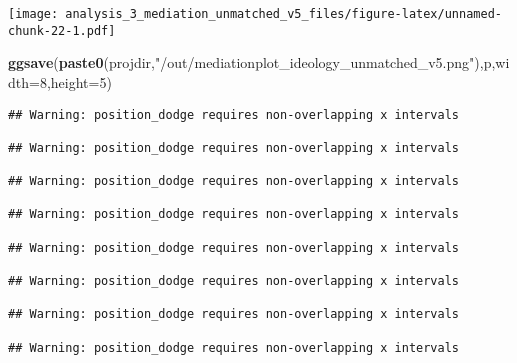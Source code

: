 \documentclass[
]{article}
\newenvironment{Shaded}{\begin{snugshade}}{\end{snugshade}}
\newcommand{\DataTypeTok}[1]{\textcolor[rgb]{0.13,0.29,0.53}{#1}}
\newcommand{\DecValTok}[1]{\textcolor[rgb]{0.00,0.00,0.81}{#1}}
\newcommand{\KeywordTok}[1]{\textcolor[rgb]{0.13,0.29,0.53}{\textbf{#1}}}
\newcommand{\NormalTok}[1]{#1}
\newcommand{\StringTok}[1]{\textcolor[rgb]{0.31,0.60,0.02}{#1}}
\begin{document}
\texttt{[image: analysis\_3\_mediation\_unmatched\_v5\_files/figure-latex/unnamed-chunk-22-1.pdf]}

\begin{Shaded}
\begin{Highlighting}[]
\KeywordTok{ggsave}\NormalTok{(}\KeywordTok{paste0}\NormalTok{(projdir,}\StringTok{"/out/mediationplot_ideology_unmatched_v5.png"}\NormalTok{),p,}\DataTypeTok{width=}\DecValTok{8}\NormalTok{,}\DataTypeTok{height=}\DecValTok{5}\NormalTok{)}
\end{Highlighting}
\end{Shaded}

\begin{verbatim}
## Warning: position_dodge requires non-overlapping x intervals

## Warning: position_dodge requires non-overlapping x intervals

## Warning: position_dodge requires non-overlapping x intervals

## Warning: position_dodge requires non-overlapping x intervals

## Warning: position_dodge requires non-overlapping x intervals

## Warning: position_dodge requires non-overlapping x intervals

## Warning: position_dodge requires non-overlapping x intervals

## Warning: position_dodge requires non-overlapping x intervals
\end{verbatim}
\end{document}
